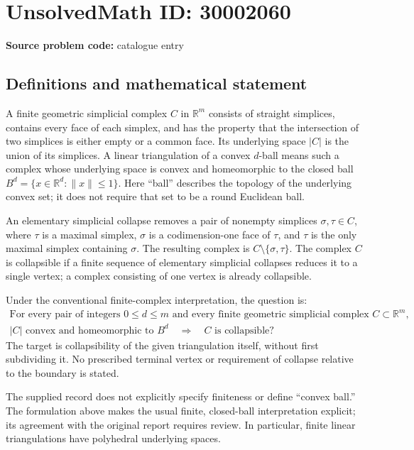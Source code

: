 \documentclass[11pt]{article}
\newcommand{\R}{\mathbb{R}}
\begin{document}
\section*{UnsolvedMath ID: 30002060}
\textbf{Source problem code:} catalogue entry
\subsection{Definitions and mathematical statement}
A finite geometric simplicial complex \(C\) in \(\R^m\) consists of straight simplices, contains every face of each simplex, and has the property that the intersection of two simplices is either empty or a common face. Its underlying space \(|C|\) is the union of its simplices. A linear triangulation of a convex \(d\)-ball means such a complex whose underlying space is convex and homeomorphic to the closed ball \(B^d=\{x\in\R^d:\|x\|\leq 1\}\). Here ``ball'' describes the topology of the underlying convex set; it does not require that set to be a round Euclidean ball.

An elementary simplicial collapse removes a pair of nonempty simplices \(\sigma,\tau\in C\), where \(\tau\) is a maximal simplex, \(\sigma\) is a codimension-one face of \(\tau\), and \(\tau\) is the only maximal simplex containing \(\sigma\). The resulting complex is \(C\setminus\{\sigma,\tau\}\). The complex \(C\) is collapsible if a finite sequence of elementary simplicial collapses reduces it to a single vertex; a complex consisting of one vertex is already collapsible.

Under the conventional finite-complex interpretation, the question is:
\[
\begin{gathered}
\text{For every pair of integers }0\leq d\leq m\text{ and every finite geometric simplicial complex }C\subset\R^m,\\
|C|\text{ convex and homeomorphic to }B^d
\quad\Longrightarrow\quad
C\text{ is collapsible}?
\end{gathered}
\]
The target is collapsibility of the given triangulation itself, without first subdividing it. No prescribed terminal vertex or requirement of collapse relative to the boundary is stated.

The supplied record does not explicitly specify finiteness or define ``convex ball.'' The formulation above makes the usual finite, closed-ball interpretation explicit; its agreement with the original report requires review. In particular, finite linear triangulations have polyhedral underlying spaces.
\end{document}

